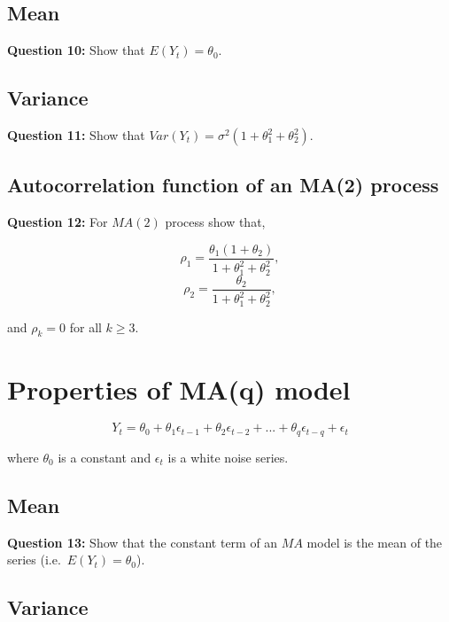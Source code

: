 \documentclass[
  11pt,
  a4paper,
]{report}
\begin{document}
\subsection{Mean}\label{mean-4}

\textbf{Question 10: } Show that \(E(Y_t) = \theta_0.\)

\subsection{Variance}\label{variance-3}

\textbf{Question 11: } Show that
\(Var(Y_t) = \sigma^2 (1+\theta_1^2 + \theta_2^2).\)

\subsection{Autocorrelation function of an MA(2)
process}\label{autocorrelation-function-of-an-ma2-process}

\textbf{Question 12: }For \(MA(2)\) process show that,

\[\rho_1=\frac{\theta_1(1+\theta_2)}{1+\theta_1^2+\theta_2^2},\]
\[\rho_2 = \frac{\theta_2}{1+\theta_1^2 + \theta_2^2},\]

and \(\rho_k=0\) for all \(k \geq 3.\)

\section{Properties of MA(q) model}\label{properties-of-maq-model}

\begin{equation}
  \label{eq:ma2}
Y_t = \theta_0 + \theta_1 \epsilon_{t-1} + \theta_2 \epsilon_{t-2} +...+ \theta_q \epsilon_{t-q} +\epsilon_t
\end{equation}

where \(\theta_0\) is a constant and \({\epsilon_t}\) is a white noise
series.

\subsection{Mean}\label{mean-5}

\textbf{Question 13:} Show that the constant term of an \(MA\) model is
the mean of the series (i.e.~\(E(Y_t)=\theta_0\)).

\subsection{Variance}\label{variance-4}
\end{document}
